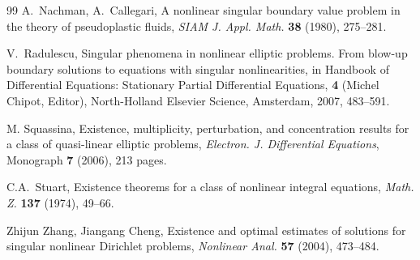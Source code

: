 \documentclass[10pt]{amsart}
\numberwithin{equation}{section}
\theoremstyle{definition}
\begin{document}
\begin{thebibliography}{99}
{\sc A.\ Nachman, A.\ Callegari}, 
A nonlinear singular boundary value problem in the theory of pseudoplastic fluids, 
{\em SIAM J. Appl. Math.} {\bf 38} (1980), 275--281. 

{\sc V.\ Radulescu},
Singular phenomena in nonlinear elliptic problems. From blow-up boundary 
solutions to equations with singular nonlinearities, in Handbook of 
Differential Equations: Stationary Partial Differential Equations, {\bf 4} 
(Michel Chipot, Editor), North-Holland Elsevier Science, Amsterdam, 2007, 483--591.

{\sc M. Squassina},  
Existence, multiplicity, perturbation, and concentration results for a class of quasi-linear elliptic problems,
{\em Electron. J. Differential Equations}, Monograph {\bf 7} (2006), 213 pages.

{\sc C.A.\ Stuart}, 
Existence theorems for a class of nonlinear integral equations, 
{\em Math. Z.} {\bf 137} (1974), 49--66.

{\sc Zhijun Zhang,  Jiangang Cheng}, 
Existence and optimal estimates of solutions for singular nonlinear Dirichlet problems,
{\em Nonlinear Anal.} {\bf 57} (2004), 473--484.

\end{thebibliography}

\medskip
\end{document}
